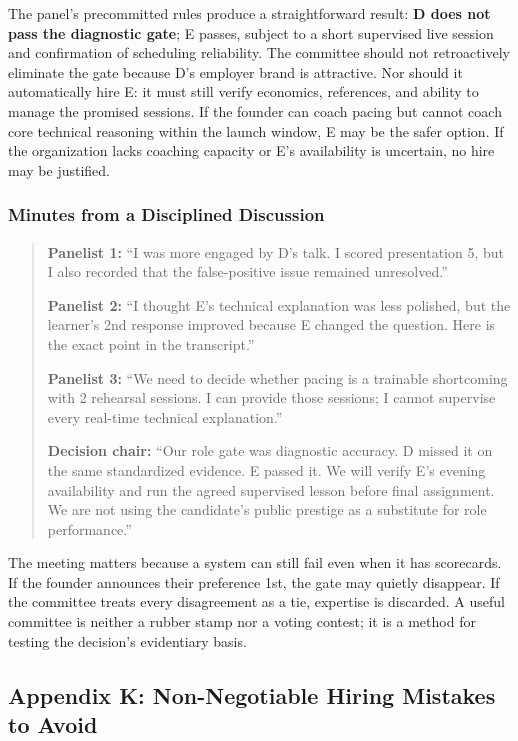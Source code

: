 The panel's precommitted rules produce a straightforward result: \textbf{D does not pass the diagnostic gate}; E passes, subject to a short supervised live session and confirmation of scheduling reliability. The committee should not retroactively eliminate the gate because D's employer brand is attractive. Nor should it automatically hire E: it must still verify economics, references, and ability to manage the promised sessions. If the founder can coach pacing but cannot coach core technical reasoning within the launch window, E may be the safer option. If the organization lacks coaching capacity or E's availability is uncertain, no hire may be justified.

\subsubsection*{Minutes from a Disciplined Discussion}

\begin{quote}
\small
\textbf{Panelist 1:} ``I was more engaged by D's talk. I scored presentation 5, but I also recorded that the false-positive issue remained unresolved.''

\textbf{Panelist 2:} ``I thought E's technical explanation was less polished, but the learner's 2nd response improved because E changed the question. Here is the exact point in the transcript.''

\textbf{Panelist 3:} ``We need to decide whether pacing is a trainable shortcoming with 2 rehearsal sessions. I can provide those sessions; I cannot supervise every real-time technical explanation.''

\textbf{Decision chair:} ``Our role gate was diagnostic accuracy. D missed it on the same standardized evidence. E passed it. We will verify E's evening availability and run the agreed supervised lesson before final assignment. We are not using the candidate's public prestige as a substitute for role performance.''
\end{quote}

The meeting matters because a system can still fail even when it has scorecards. If the founder announces their preference 1st, the gate may quietly disappear. If the committee treats every disagreement as a tie, expertise is discarded. A useful committee is neither a rubber stamp nor a voting contest; it is a method for testing the decision's evidentiary basis.

\subsection*{Appendix K: Non-Negotiable Hiring Mistakes to Avoid}

